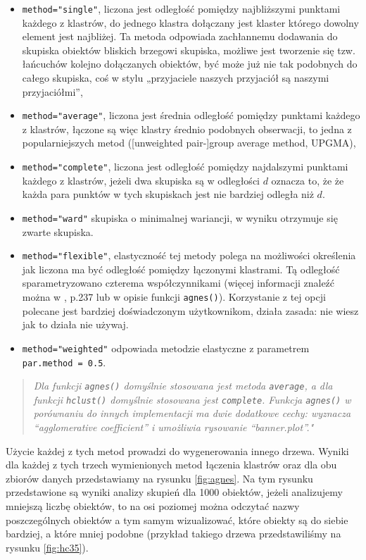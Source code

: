 \documentclass[polish,]{book}
\begin{document}
\begin{itemize}
\item
  \texttt{method="single"}, liczona jest odległość pomiędzy najbliższymi punktami każdego z klastrów, do jednego klastra dołączany jest klaster którego dowolny element jest najbliżej. Ta metoda odpowiada zachłannemu dodawania do skupiska
  obiektów bliskich brzegowi skupiska, możliwe jest tworzenie się tzw. łańcuchów
  kolejno dołączanych obiektów, być może już nie tak podobnych do całego skupiska, coś w stylu „przyjaciele naszych przyjaciół są naszymi przyjaciółmi'',
\item
  \texttt{method="average"}, liczona jest średnia odległość pomiędzy punktami każdego
  z klastrów, łączone są więc klastry średnio podobnych obserwacji, to jedna z
  popularniejszych metod ({[}unweighted pair-{]}group average method, UPGMA),
\item
  \texttt{method="complete"}, liczona jest odległość pomiędzy najdalszymi punktami
  każdego z klastrów, jeżeli dwa skupiska są w odległości \(d\) oznacza to, że że
  każda para punktów w tych skupiskach jest nie bardziej odległa niż \(d\).
\item
  \texttt{method="ward"} skupiska o minimalnej wariancji, w wyniku otrzymuje się zwarte skupiska.
\item
  \texttt{method="flexible"}, elastyczność tej metody polega na możliwości określenia
  jak liczona ma być odległość pomiędzy łączonymi klastrami. Tą odległość sparametryzowano czterema współczynnikami (więcej informacji znaleźć można w \citet{KR1990}, p.237 lub w opisie funkcji \texttt{agnes()}). Korzystanie z tej opcji polecane jest
  bardziej doświadczonym użytkownikom, działa zasada: nie wiesz jak to działa
  nie używaj.
\item
  \texttt{method="weighted"} odpowiada metodzie elastyczne z parametrem \texttt{par.method\ =\ 0.5}.
\end{itemize}

\begin{quote}
\emph{Dla funkcji \texttt{agnes()} domyślnie stosowana jest metoda \texttt{average}, a dla
funkcji \texttt{hclust()} domyślnie stosowana jest \texttt{complete}. Funkcja \texttt{agnes()}
w porównaniu do innych implementacji ma dwie dodatkowe cechy: wyznacza ``agglomerative coefficient'' i umożliwia rysowanie ``banner.plot''."}
\end{quote}

Użycie każdej z tych metod prowadzi do wygenerowania innego drzewa. Wyniki
dla każdej z tych trzech wymienionych metod łączenia klastrów oraz dla obu zbiorów danych przedstawiamy na rysunku \ref{fig:agnes}. Na tym rysunku przedstawione są wyniki
analizy skupień dla 1000 obiektów, jeżeli analizujemy mniejszą liczbę obiektów, to
na osi poziomej można odczytać nazwy poszczególnych obiektów a tym samym wizualizować, które obiekty są do siebie bardziej, a które mniej podobne (przykład
takiego drzewa przedstawiliśmy na rysunku \ref{fig:hc35}).
\end{document}
